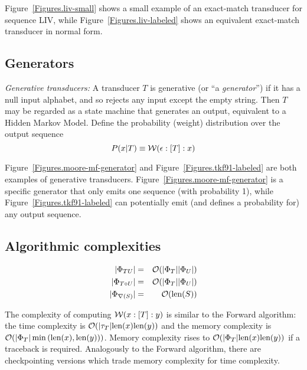 \documentclass{article}
\newcommand{\seclabel}[1]{\label{sec.#1}}
\newcommand{\figref}[1]{Figure~\ref{Figures.#1}}
\newcommand\gappedalphabet[1]{(\Omega_{#1} \cup \{\epsilon\})}
\newcommand\gapsquared{\gappedalphabet{}^2}
\newcommand\wtrans[4]{#1(#2 : [#3] : #4)}
\newcommand\compose{}
\newcommand\fork{\circ}
\newcommand\recognize{\nabla}
\newcommand\States{\Phi}
\newcommand\statesof[1]{\States_{#1}}
\newcommand\Transitions{\tau}
\newcommand\transitionsof[1]{\Transitions_{#1}}
\newcommand\weight{{\cal W}}
\newcommand\numberofstates[1]{|\statesof{#1}|}
\newcommand\numberoftransitions[1]{|\transitionsof{#1}|}
\newcommand\seqlen[1]{\mbox{len}(#1)}
\newcommand\order[1]{{\cal O}(#1)}
\begin{document}
\figref{liv-small} shows a small example of an exact-match transducer for sequence LIV,
while \figref{liv-labeled} shows an equivalent exact-match transducer in normal form.




\subsection{Generators}
\seclabel{GenSinglet}
{\em Generative transducers:}
A transducer $T$ is generative (or ``a {\em generator}'') if it has a null input alphabet, and so rejects any input except the empty string.
Then $T$ may be regarded as a state machine that generates an output, equivalent to a Hidden Markov Model.
Define the probability (weight) distribution over the output sequence
\[
P(x|T) \equiv \wtrans{\weight}{\epsilon}{T}{x}
\]

\figref{moore-mf-generator} and \figref{tkf91-labeled} are both examples of generative transducers.
\figref{moore-mf-generator} is a specific generator that only emits one sequence (with probability 1),
while \figref{tkf91-labeled} can potentially emit (and defines a probability for) any output sequence.



\subsection{Algorithmic complexities}
\begin{eqnarray*}
\numberofstates{T \compose U} & = & \order{\numberofstates{T} \numberofstates{U}} \\
\numberofstates{T \fork U} & = & \order{\numberofstates{T} \numberofstates{U}} \\
\numberofstates{\recognize(S)} & = & \order{\seqlen{S}}
\end{eqnarray*}

The complexity of computing $\wtrans{\weight}{x}{T}{y}$ is similar to the Forward algorithm:
the time complexity is $\order{\numberoftransitions{T} \seqlen{x} \seqlen{y}}$ and
the memory complexity is $\order{\numberofstates{T} \min\left(\seqlen{x},\seqlen{y}\right)}$.
Memory complexity rises to $\order{\numberofstates{T} \seqlen{x} \seqlen{y}}$ if a traceback is required.
Analogously to the Forward algorithm, there are checkpointing versions which trade memory complexity for time complexity.
\end{document}
